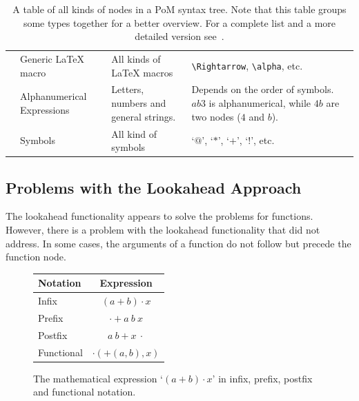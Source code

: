 \documentclass[a4paper,11pt]{article}
\newcommand{\tbs}{\textbackslash}
\theoremstyle{defTheoStyle}
\theoremstyle{defExampStyle}
\begin{document}
\begin{table}[t!]
\begin{tabularx}{\textwidth}{Y{1.55cm} Y{2.5cm} L L}
			 & Generic \LaTeX{} macro & All kinds of \LaTeX{} macros & \texttt{\tbs Rightarrow}, \texttt{\tbs alpha}, etc.\\
			 & Alphanumerical Expressions & Letters, numbers and general strings. & Depends on the order of symbols. $ab3$ is alphanumerical, while $4b$ are two nodes ($4$ and $b$).\\
			 & Symbols & All kind of symbols & `$@$', `$*$', `$+$', `$!$', etc.\\
			\hline
		\end{tabularx}
		\caption{A table of all kinds of nodes in a PoM syntax tree. Note that this table groups some types together for a better overview. For a complete list and a more detailed version see~\parencite{POM-Tagger}.}
		\label{tab:allTypesTable}
	\end{table} 
	
	\subsection{Problems with the Lookahead Approach}
	The lookahead functionality appears to solve the problems for functions. However, there is a problem with the lookahead functionality that  did not address. In some cases, the arguments of a function do not follow but precede the function node. 
	
	\begin{figure}%
		\begin{minipage}{0.38\textwidth}
			\center
			\begin{tabular}{lc}
				\hline
				Notation & Expression \\
				\hline
				Infix & $(a+b) \cdot x$\\
				Prefix & $\cdot + a\ b\ x$\\
				Postfix & $a\ b + x\ \cdot$\\
				Functional & $\cdot(+(a, b), x)$\\
				\hline
			\end{tabular}
			\caption{The mathematical expression `$(a+b) \cdot x$' in infix, prefix, postfix and functional notation.}
			\label{tab:notations}
		\end{minipage}
	\end{figure}
	
\end{document}
